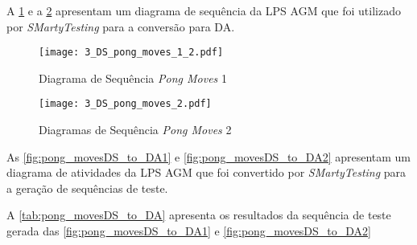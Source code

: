 
A \ref{fig:pong_movesKleber1} e a \ref{fig:pong_movesKleber2} apresentam um diagrama de sequência da LPS AGM que foi utilizado por \textit{SMartyTesting} para a conversão para DA.

	\begin{figure}[H]
		\centering
		\texttt{[image: 3\_DS\_pong\_moves\_1\_2.pdf]}
		\caption{Diagrama de Sequência \textit{Pong Moves} 1 \cite{marcolino2017variability}}
		\label{fig:pong_movesKleber1}
	\end{figure}

\begin{landscape}
	\begin{figure}[H]
		\centering
		\texttt{[image: 3\_DS\_pong\_moves\_2.pdf]}
		\caption{Diagramas de Sequência \textit{Pong Moves} 2 \cite{marcolino2017variability}}
		\label{fig:pong_movesKleber2}
	\end{figure}
\end{landscape}

As \ref{fig:pong_movesDS_to_DA1} e \ref{fig:pong_movesDS_to_DA2} apresentam um diagrama de atividades da LPS AGM que foi convertido por \textit{SMartyTesting} para a geração de sequências de teste.

A \ref{tab:pong_movesDS_to_DA} apresenta os resultados da sequência de teste gerada das \ref{fig:pong_movesDS_to_DA1} e \ref{fig:pong_movesDS_to_DA2}


